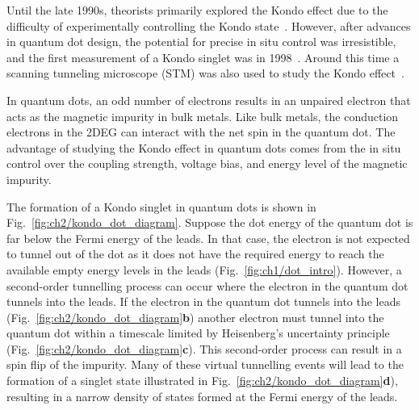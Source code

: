 Until the late 1990s, theorists primarily explored the Kondo effect due to the difficulty of experimentally controlling the Kondo state~\cite{kondo_review}. However, after advances in quantum dot design, the potential for precise in situ control was irresistible, and the first measurement of a Kondo singlet was in 1998~\cite{goldhaber_first_kondo}. Around this time a scanning tunneling microscope (STM) was also used to study the Kondo effect~\cite{stm_kondo}.

In quantum dots, an odd number of electrons results in an unpaired electron that acts as the magnetic impurity in bulk metals. Like bulk metals, the conduction electrons in the 2DEG can interact with the net spin in the quantum dot. The advantage of studying the Kondo effect in quantum dots comes from the in situ control over the coupling strength, voltage bias, and energy level of the magnetic impurity.

The formation of a Kondo singlet in quantum dots is shown in Fig.~\ref{fig:ch2/kondo_dot_diagram}. 
Suppose the dot energy of the quantum dot is far below the Fermi energy of the leads. In that case, the electron is not expected to tunnel out of the dot as it does not have the required energy to reach the available empty energy levels in the leads (Fig.~\ref{fig:ch1/dot_intro}). However, a second-order tunnelling process can occur where the electron in the quantum dot tunnels into the leads. If the electron in the quantum dot tunnels into the leads (Fig.~\ref{fig:ch2/kondo_dot_diagram}\textbf{b}) another electron must tunnel into the quantum dot within a timescale limited by Heisenberg’s uncertainty principle (Fig.~\ref{fig:ch2/kondo_dot_diagram}\textbf{c}). This second-order process can result in a spin flip of the impurity. Many of these virtual tunnelling events will lead to the formation of a singlet state illustrated in Fig.~\ref{fig:ch2/kondo_dot_diagram}\textbf{d}), resulting in a narrow density of states formed at the Fermi energy of the leads. 


